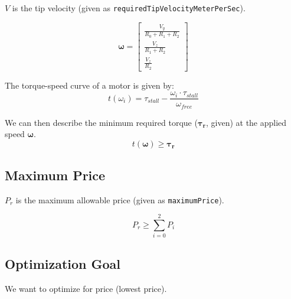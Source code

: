 \documentclass{article}
\begin{document}
$V$ is the tip velocity (given as \texttt{requiredTipVelocityMeterPerSec}).

\begin{equation}
    \boldsymbol{\omega} =
    \begin{bmatrix}
        \frac{V_y}{R_0 + R_1 + R_2} \\[6pt]
        \frac{V_z}{R_1 + R_2} \\[6pt]
        \frac{V_z}{R_2}
    \end{bmatrix}
\end{equation}

The torque-speed curve of a motor is given by:
\begin{equation}
    t(\omega_i) = \tau_{stall} - \frac{\omega_i \cdot \tau_{stall}}{\omega_{free}}
\end{equation}

We can then describe the minimum required torque ($\boldsymbol{\tau_r}$, given) at the applied speed
$\boldsymbol{\omega}$.
\begin{equation}
    t(\boldsymbol{\omega}) \geq \boldsymbol{\tau_r}
\end{equation}

\FloatBarrier
\subsection{Maximum Price}

$P_r$ is the maximum allowable price (given as \texttt{maximumPrice}).

\begin{equation}
    P_r \geq \sum_{i=0}^{2}{P_i}
\end{equation}

\FloatBarrier
\subsection{Optimization Goal}

We want to optimize for price (lowest price).
\end{document}
